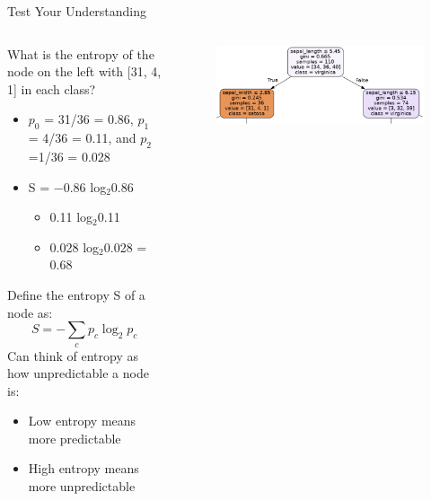 \documentclass[aspectratio=169]{../latex_main/tntbeamer}  %
\begin{document}
	
	\begin{frame}{Test Your Understanding}
	    \begin{columns}
	        \begin{column}{.7\textwidth}
	                What is the entropy of the node on the left with [31, 4, 1] in each class?
	                \begin{itemize}
	                    \item $p_0$ = 31/36 = 0.86, $p_1$ = 4/36 = 0.11, and $p_2$=1/36 = 0.028
	                    \item S =  −0.86 log$_2$⁡0.86 
	                    \begin{itemize}
	                        \item 0.11 log$_2$⁡0.11 
	                        \item 0.028 log$_2$⁡0.028 = 0.68
	                    \end{itemize}
	                \end{itemize}
	                Define the entropy S of a node as:
                    \begin{equation*}
                        S = -\sum\limits_c p_c\log_2p_c
                    \end{equation*}
                    Can think of entropy as how unpredictable a node is:
                    \begin{itemize}
                        \item Low entropy means more predictable 
                        \item High entropy means more unpredictable
                    \end{itemize}
	        \end{column}
	        
	        \begin{column}{.3\textwidth}
	                \begin{figure}
	                    \centering
	                    \includegraphics[scale=.35]{Bild47}
	                \end{figure}
	                
	                
	        \end{column}
	    \end{columns}
	\end{frame}
	
\end{document}
